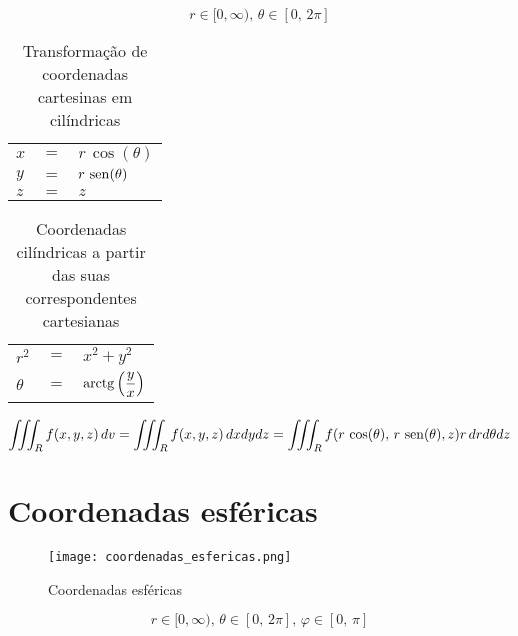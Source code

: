	$$r \in [0, \infty),\, \theta \in [0,\, 2\pi]$$
	
	\begin{table}[H]
		\caption{Transformação de coordenadas cartesinas em cilíndricas}
		\label{transformacao_coordenadas_cartesianas_cilindricas}
		\centering		
		\begin{tabular}{|lcl|}
			$x$ & $=$ & $r\,\cos(\theta)$ \\
			$y$ & $=$ & $r\,\operatorname{sen}(\theta)$ \\
			$z$ & $=$ & $z$
		\end{tabular}		
	\end{table}
	\begin{table}[H]
		\caption{Coordenadas cilíndricas a partir das suas correspondentes cartesianas}
		\label{correpondentes_coordenadas_cartesianas_cilindricas}
		\centering		
		\begin{tabular}{|lcl|}
			$r^2$ & $=$ & $x^2 + y^2$                       \\
			$\theta$   & $=$ & $\operatorname{arctg}\left(\dfrac{y}{x}\right)$
		\end{tabular}		
	\end{table}
	
	\begin{equation*}
		\iiint_R f(x,y,z)\, dv = \iiint_R f(x,y,z)\, dxdydz = \iiint_R f(r\,\cos(\theta),\,r\,\operatorname{sen}(\theta),z) r\,dr d\theta dz
	\end{equation*}
	
\section{Coordenadas esféricas}
	
	\begin{figure}[H]
		\caption{Coordenadas esféricas}
		\label{coordenadas_esfericas}
		\centering
		\texttt{[image: coordenadas\_esfericas.png]}		
	\end{figure}
	
	$$r \in [0, \infty),\, \theta \in [0,\, 2\pi],\, \varphi \in [0,\, \pi]$$
	
